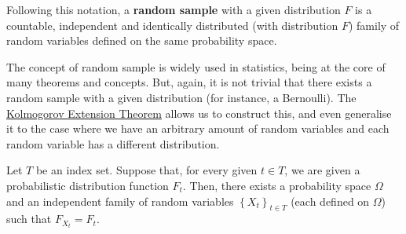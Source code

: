 Following this notation, a \textbf{random sample} with a given distribution \(F\) is a countable, independent and identically distributed (with distribution \(F\)) family of random variables defined on the same probability space.

The concept of random sample is widely used in statistics, being at the core of many theorems and concepts. But, again, it is not trivial that there exists a random sample with a given distribution (for instance, a Bernoulli). The \hyperref[theorem:Kolmogorov Extension]{Kolmogorov Extension Theorem} allows us to construct this, and even generalise it to the case where we have an arbitrary amount of random variables and each random variable has a different distribution.

\begin{thrm}\label{theorem:existence of stochastic}
		Let \(T\) be an index set. Suppose that, for every given \(t\in T\), we are given a probabilistic distribution function \(F_t\). Then, there exists a probability space \(\Omega\) and an independent family of random variables \(\left\{X_t\right\}_{t\in T}\) (each defined on \(\Omega\)) such that 
		\(F_{X_t}=F_t\).
\end{thrm}
